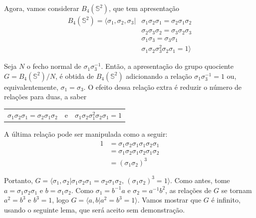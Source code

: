 \documentclass[a4paper,portuguese,11pt,twoside, leqno]{book}
\theoremstyle{definition}
\begin{document}
	\par\vspace{0.3cm} Agora, vamos considerar $B_4(\mathbb{S}^2)$, que tem apresentação
	\begin{align*}
	B_4(\mathbb{S}^2) = \langle \sigma_1, \sigma_2, \sigma_3| &\sigma_1\sigma_2\sigma_1 = \sigma_2\sigma_1\sigma_2 \\ &\sigma_2\sigma_3\sigma_2 = \sigma_3\sigma_2\sigma_3 \\
	&\sigma_1\sigma_3 = \sigma_3\sigma_1\\
	&\sigma_1\sigma_2\sigma_3^2\sigma_2\sigma_1 = 1\rangle
	\end{align*}
	
	\par\vspace{0.3cm} Seja $N$ o fecho normal de $\sigma_1\sigma_3^{-1}$. Então, a apresentação do grupo quociente $G = B_4(\mathbb{S}^2)/N$, é obtida de $B_4(\mathbb{S}^2)$ adicionando a relação $\sigma_1\sigma_3^{-1} = 1$ ou, equivalentemente, $\sigma_1=\sigma_3$. O efeito dessa relação extra é reduzir o número de relações para duas, a saber
	\begin{center}
		\begin{tabular}{ccc}
			$\sigma_1\sigma_2\sigma_1 = \sigma_2\sigma_1\sigma_2$ & e & $\sigma_1\sigma_2\sigma_1^2\sigma_2\sigma_1 = 1$ \\
		\end{tabular}
	\end{center}
	
	\par\vspace{0.3cm} A última relação pode ser manipulada como a seguir:
	\begin{align*}
	1 &= \sigma_1\sigma_2\sigma_1\sigma_1\sigma_2\sigma_1 \\
	&= \sigma_1\sigma_2\sigma_1\sigma_2\sigma_1\sigma_2 \\ 
	&= (\sigma_1\sigma_2)^3  
	\end{align*}
	\par\vspace{0.3cm} Portanto, $G = \langle \sigma_1, \sigma_2| \sigma_1\sigma_2\sigma_1=\sigma_2\sigma_1\sigma_2\text{, } (\sigma_1\sigma_2)^3=1 \rangle$. Como antes, tome $a = \sigma_1\sigma_2\sigma_1$ e $b = \sigma_1\sigma_2$. Como $\sigma_1 = b^{-1}a$ e $\sigma_2 = a^{-1}b^2$, as relações de $G$ se tornam $a^2 = b^3$ e $b^3 = 1$, logo $G = \langle a,b|a^2=b^3=1 \rangle$. Vamos mostrar que $G$ é infinito, usando o seguinte lema, que será aceito sem demonstração.
	
\end{document}
